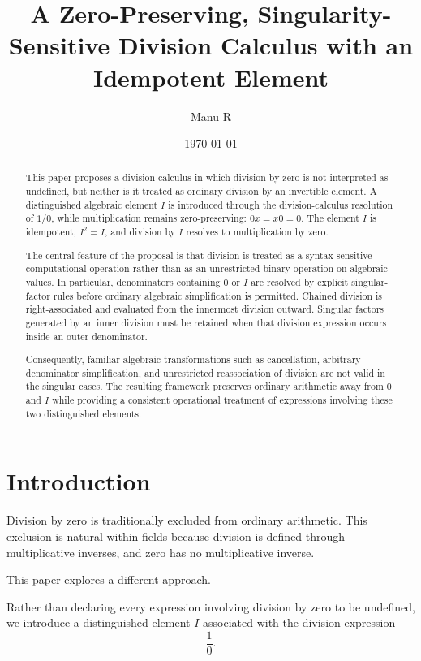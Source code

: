 \documentclass[11pt,a4paper]{article}
\title{\textbf{A Zero-Preserving, Singularity-Sensitive Division Calculus with an Idempotent Element}}
\author{Manu R}
\date{\today}
\begin{document}
\maketitle

\begin{abstract}
This paper proposes a division calculus in which division by zero is not
interpreted as undefined, but neither is it treated as ordinary division by
an invertible element. A distinguished algebraic element $I$ is introduced
through the division-calculus resolution of $1/0$, while multiplication
remains zero-preserving: $0x=x0=0$. The element $I$ is idempotent,
$I^2=I$, and division by $I$ resolves to multiplication by zero.

The central feature of the proposal is that division is treated as a
syntax-sensitive computational operation rather than as an unrestricted
binary operation on algebraic values. In particular, denominators containing
$0$ or $I$ are resolved by explicit singular-factor rules before ordinary
algebraic simplification is permitted. Chained division is right-associated
and evaluated from the innermost division outward. Singular factors generated
by an inner division must be retained when that division expression occurs
inside an outer denominator.

Consequently, familiar algebraic transformations such as cancellation,
arbitrary denominator simplification, and unrestricted reassociation of
division are not valid in the singular cases. The resulting framework
preserves ordinary arithmetic away from $0$ and $I$ while providing a
consistent operational treatment of expressions involving these two
distinguished elements.
\end{abstract}

\tableofcontents

\section{Introduction}

Division by zero is traditionally excluded from ordinary arithmetic.
This exclusion is natural within fields because division is defined through
multiplicative inverses, and zero has no multiplicative inverse.

This paper explores a different approach.

Rather than declaring every expression involving division by zero to be
undefined, we introduce a distinguished element $I$ associated with the
division expression
\[
\frac{1}{0}.
\]
\end{document}
